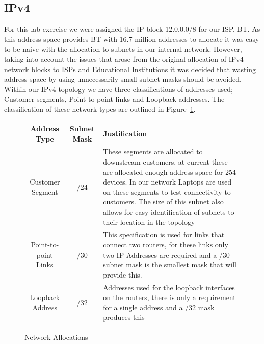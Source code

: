 \subsection{IPv4}
For this lab exercise we were assigned the IP block 12.0.0.0/8 for our ISP, BT.
As this address space provides BT with 16.7 million addresses to allocate it was
easy to be naive with the allocation to subnets in our internal network.
However, taking into account the issues that arose from the original allocation
of IPv4 network blocks to ISPs and Educational Institutions it was decided that
wasting address space by using unnecessarily small subnet masks should be
avoided. Within our IPv4 topology we have three classifications of addresses
used; Customer segments, Point-to-point links and Loopback addresses. The
classification of these network types are outlined in
Figure~\ref{figure:network-alloc-1}.


\begin{figure}[h!]
	\caption{Network Allocations}
	\label{figure:network-alloc-1}
	\centering
	\begin{tabular}{|c|c|p{5.5cm}|}
		\hline \textbf{Address Type} & \textbf{Subnet Mask} & \textbf{Justification} \\
		\hline Customer Segment & /24 & These segments are allocated to downstream customers, at current these are allocated enough address space for 254 devices. In our network Laptops are used on these segments to test connectivity to customers. The size of this subnet also allows for easy identification of subnets to their location in the topology  \\
		\hline Point-to-point Links & /30 & This specification is used for links that connect two routers, for these links only two IP Addresses are required and a /30 subnet mask is the smallest mask that will provide this. \\
		\hline Loopback Address & /32 & Addresses used for the loopback interfaces on the routers, there is only a requirement for a single address and a /32 mask produces this \\
		\hline
	\end{tabular}
\end{figure}


